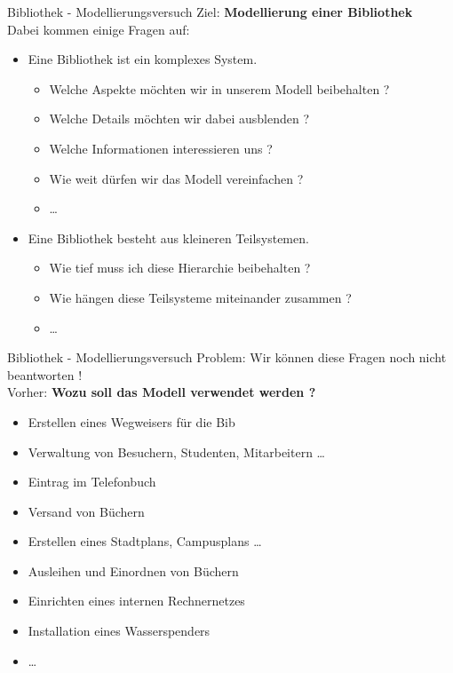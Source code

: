 \documentclass[18pt]{beamer}
\begin{document}
\begin{frame}{Bibliothek - Modellierungsversuch}
    Ziel: \textbf{Modellierung einer Bibliothek}\\
    Dabei kommen einige Fragen auf:
    \begin{itemize}
        \item Eine Bibliothek ist ein komplexes System.
        \begin{itemize}
            \item Welche Aspekte möchten wir in unserem Modell beibehalten ?
            \item Welche Details möchten wir dabei ausblenden ?
            \item Welche Informationen interessieren uns ?
            \item Wie weit dürfen wir das Modell vereinfachen ?
            \item \dots
        \end{itemize}
        \item Eine Bibliothek besteht aus kleineren Teilsystemen.
        \begin{itemize}
            \item Wie tief muss ich diese Hierarchie beibehalten ?
            \item Wie hängen diese Teilsysteme miteinander zusammen ?
            \item \dots
        \end{itemize}
    \end{itemize}
\end{frame}

\begin{frame}{Bibliothek - Modellierungsversuch}
    Problem: Wir können diese Fragen noch nicht beantworten !\\
    Vorher: \textbf{Wozu soll das Modell verwendet werden ?}
    \pause
    \begin{itemize}
        \item Erstellen eines Wegweisers für die Bib
        \item Verwaltung von Besuchern, Studenten, Mitarbeitern \dots
        \item Eintrag im Telefonbuch
        \item Versand von Büchern
        \item Erstellen eines Stadtplans, Campusplans \dots
        \item Ausleihen und Einordnen von Büchern
        \item Einrichten eines internen Rechnernetzes
        \item Installation eines Wasserspenders
        \item \dots
    \end{itemize}
\end{frame}
\end{document}
